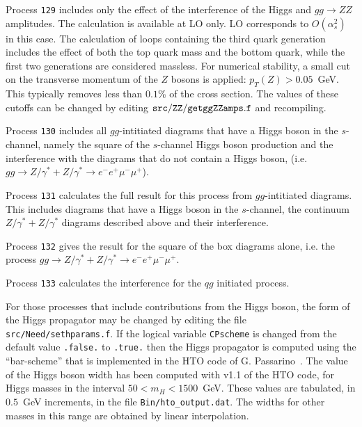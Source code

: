 Process {\tt 129} includes only the effect of the interference of the
Higgs and $gg \to ZZ$ amplitudes.
The calculation is available at LO only. LO corresponds to $O(\alpha_s^2)$ in this case.
The calculation of loops containing the third quark generation
includes the effect of both the top quark mass and the bottom quark, while the first two
generations are considered massless. For numerical stability, a small cut on the
transverse momentum of the $Z$ bosons is applied: $p_T(Z)>0.05$~GeV.
This typically removes less than $0.1$\% of the cross section. The
values of these cutoffs can be changed by editing ${\tt src/ZZ/getggZZamps.f}$ and recompiling.

Process {\tt 130} includes all $gg$-intitiated diagrams that have a Higgs boson in the $s$-channel,
namely the square of the $s$-channel Higgs boson production and the interference with the diagrams
that do not contain a Higgs boson, (i.e. $gg \to Z/\gamma^*+Z/\gamma^* \to e^- e^+ \mu^- \mu^+$).

Process {\tt 131} calculates the full result for this process from  $gg$-intitiated diagrams.
This includes diagrams that have a Higgs boson in the $s$-channel, the continuum $ Z/\gamma^*+Z/\gamma^*$
diagrams described above and their interference. 

Process {\tt 132}  gives the result for the square of the box diagrams alone, i.e. the process
$gg \to Z/\gamma^*+Z/\gamma^* \to e^- e^+ \mu^- \mu^+$.

Process {\tt 133} calculates the interference for the $qg$ initiated process.

For those processes that include contributions from the Higgs boson, the form
of the Higgs propagator may be changed by editing the file
{\tt src/Need/sethparams.f}.  If the logical variable {\tt CPscheme} is
changed from the default value {\tt .false.} to {\tt .true.} then the
Higgs propagator is computed using the ``bar-scheme'' that is
implemented in the HTO code of G. Passarino~\cite{Goria:2011wa,Passarino:2010qk}.
The value of the Higgs boson width has been computed with v1.1 of the
HTO code, for Higgs masses in the interval $50 < m_H< 1500$~GeV.  These
values are tabulated, in $0.5$~GeV increments, in the file
{\tt Bin/hto\_output.dat}.  The widths for other masses in this range
are obtained by linear interpolation.

